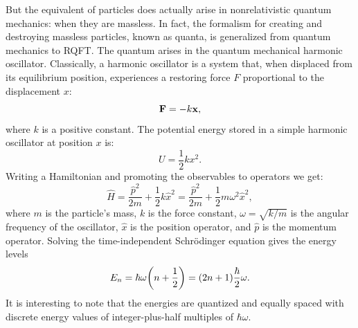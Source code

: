 But the equivalent of particles does actually arise in nonrelativistic quantum mechanics: when they are massless. In fact, the formalism for creating and destroying massless particles, known as quanta, is generalized from quantum mechanics to RQFT. The quantum arises in the quantum mechanical harmonic oscillator. Classically, a harmonic oscillator is a system that, when displaced from its equilibrium position, experiences a restoring force $F$ proportional to the displacement $x$:
\begin{equation}
\vb{F}=-k\vb{x},
\end{equation}
where $k$ is a positive constant. The potential energy stored in a simple harmonic oscillator at position $x$ is:
\begin{equation}
U=\frac{1}{2}kx^2.
\end{equation}
Writing a Hamiltonian and promoting the observables to operators we get:
\begin{equation}
\hat{H} = \frac{\hat{p}^2}{2m} + \frac{1}{2}k\hat{x}^2 = \frac{\hat{p}^2}{2m} + \frac{1}{2}m\omega^2 \hat{x}^2,
\end{equation}
where $m$ is the particle's mass, $k$ is the force constant, $\omega = \sqrt{k/m}$ is the angular frequency of the oscillator, $\hat{x}$ is the position operator, and $\hat{p}$ is the momentum operator. Solving the time-independent Schr{\"o}dinger equation gives the energy levels
\begin{equation}
E_n=\hbar\omega\qty(n+\frac{1}{2})=\qty(2n+1)\frac{\hbar}{2}\omega.
\end{equation}
It is interesting to note that the energies are quantized and equally spaced with discrete energy values of integer-plus-half multiples of $\hbar\omega$.

